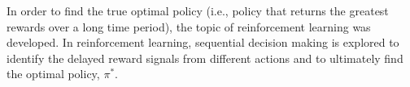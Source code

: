 In order to find the true optimal policy (i.e., policy that returns the greatest rewards over a long time period), the topic of reinforcement learning was developed.  In reinforcement learning, sequential decision making is explored to identify the delayed reward signals from different actions and to ultimately find the optimal policy, $\pi^*$.  